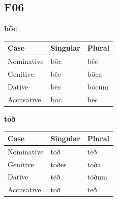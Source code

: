 \subsection*{F06}

\par\begin{minipage}{\linewidth}\raggedright
\textbf{bōc}

\par\begingroup
\fontsize{10.5}{13.2}\selectfont
\setlength{\LTleft}{0pt}\setlength{\LTright}{\fill}
\noindent
\begin{tabular}{@{}>{\raggedright\arraybackslash}p{39.46mm}>{\raggedright\arraybackslash}p{39.46mm}>{\raggedright\arraybackslash}p{39.46mm}@{}}
\toprule
\textbf{Case} & \textbf{Singular} & \textbf{Plural} \\
\midrule
Nominative & bōc & bēc \\
Genitive & bēc & bōca \\
Dative & bēc & bōcum \\
Accusative & bōc & bēc \\
\bottomrule
\end{tabular}
\par\endgroup

\textbf{tōð}

\par\begingroup
\fontsize{10.5}{13.2}\selectfont
\setlength{\LTleft}{0pt}\setlength{\LTright}{\fill}
\noindent
\begin{tabular}{@{}>{\raggedright\arraybackslash}p{39.46mm}>{\raggedright\arraybackslash}p{39.46mm}>{\raggedright\arraybackslash}p{39.46mm}@{}}
\toprule
\textbf{Case} & \textbf{Singular} & \textbf{Plural} \\
\midrule
Nominative & tōð & tēð \\
Genitive & tōðes & tōða \\
Dative & tēð & tōðum \\
Accusative & tōð & tēð \\
\bottomrule
\end{tabular}
\par\endgroup


\end{minipage}
